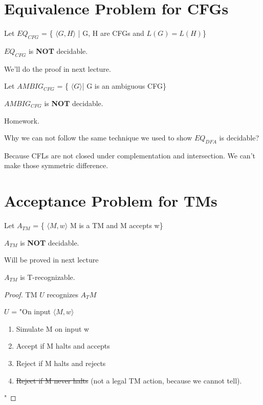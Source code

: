 \section{Equivalence Problem for CFGs}
\begin{theorem}
    Let \(EQ_{CFG}\) = \{ \(\langle G, H \rangle \) | G, H are CFGs and \(L(G) = L(H)\)\}  

    \(EQ_{CFG}\) is \textbf{NOT} decidable. 
\end{theorem}
We'll do the proof in next lecture.

\begin{theorem}
    Let \(AMBIG_{CFG}\) = \{ \(\langle G \rangle\)| G is an ambiguous CFG\}  

    \(AMBIG_{CFG}\) is \textbf{NOT} decidable.
\end{theorem}

Homework.

\begin{remark}
    Why we can not follow the same technique we used to show \(EQ_{DFA}\) is decidable?
    
    Because CFLs are not closed under complementation and intersection. We can't make those symmetric difference.
\end{remark}

\section{Acceptance Problem for TMs}
\begin{theorem}
    Let \(A_{TM}\) = \{ \(\langle M, w \rangle\) M is a TM and M accepts w\}  

    \(A_{TM}\) is \textbf{NOT} decidable. 
\end{theorem}

Will be proved in next lecture

\begin{theorem}
    \(A_{TM}\) is T-recognizable. 
\end{theorem}
\begin{proof}
    TM \(U\) recognizes \(A_TM\)  

    \(U\) = "On input \(\langle M, w \rangle\)  
    \begin{enumerate}
        \item Simulate M on input w
        \item Accept if M halts and accepts
        \item Reject if M halts and rejects
        \item \st{Reject if M never halts} (not a legal TM action, because we cannot tell). 
    \end{enumerate}
    "
\end{proof}
